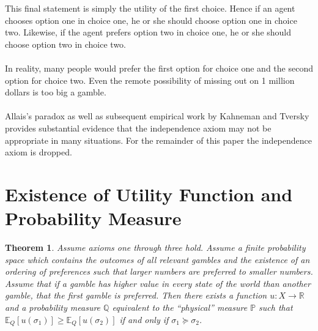 \documentclass{article}
\newtheorem{theorem}{Theorem}
\begin{document}
This final statement is simply the utility of the first choice.  Hence if an agent chooses option one in choice one, he or she should choose option one in choice two.  Likewise, if the agent prefers option two in choice one, he or she should choose option two in choice two.
\\
\\
In reality, many people would prefer the first option for choice one and the second option for choice two.  Even the remote possibility of missing out on 1 million dollars is too big a gamble. 
\\
\\
Allais's paradox as well as subsequent empirical work by Kahneman and Tversky provides substantial evidence that the independence axiom may not be appropriate in many situations.  For the remainder of this paper the independence axiom is dropped.  

 
\section{Existence of Utility Function and Probability Measure}

\begin{theorem}
Assume axioms one through three hold.  Assume a finite probability space which contains the outcomes of all relevant gambles  and the existence of an ordering of preferences such that larger numbers are preferred to smaller numbers.  Assume that if a gamble has higher value in every state of the world than another gamble, that the first gamble is preferred.  Then there exists a function \(u: X \to \mathbb{R}\) and a probability measure \(\mathbb{Q}\) equivalent to the ``physical'' measure \(\mathbb{P}\) such that \(\mathbb{E}_Q\left[u(\sigma_1)\right] \geq \mathbb{E}_Q\left[u(\sigma_2)\right]\) if and only if \(\sigma_1 \succeq \sigma_2\).  
\end{theorem}
\end{document}

